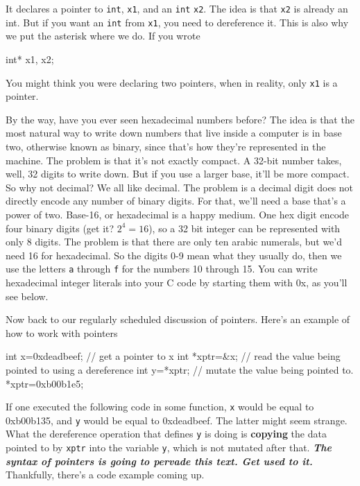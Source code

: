 \documentclass[ebook,11pt,oneside,openany]{memoir}
\newcommand{\cf}[1]{\texttt{#1}}
\begin{document}
It declares a pointer to \cf{int}, \cf{x1}, and an \cf{int} \cf{x2}. The idea is that \cf{x2} is already an int. But if you want an \cf{int} from \cf{x1}, you need to dereference it. This is also why we put the asterisk where we do. If you wrote 

\begin{code}[language=C]
int* x1, x2;
\end{code}

You might think you were declaring two pointers, when in reality, only \cf{x1} is a pointer.

By the way, have you ever seen hexadecimal numbers before? The idea is that the most natural way to write down numbers that live inside a computer is in base two, otherwise known as binary, since that's how they're represented in the machine. The problem is that it's not exactly compact. A 32-bit number takes, well, 32 digits to write down. But if you use a larger base, it'll be more compact. So why not decimal? We all like decimal. The problem is a decimal digit does not directly encode any number of binary digits. For that, we'll need a base that's a power of two. Base-16, or hexadecimal is a happy medium. One hex digit encode four binary digits (get it? $2^4=16$), so a 32 bit integer can be represented with only 8 digits. The problem is that there are only ten arabic numerals, but we'd need 16 for hexadecimal. So the digits 0-9 mean what they usually do, then we use the letters \cf{a} through \cf{f} for the numbers 10 through 15. You can write hexadecimal integer literals into your C code by starting them with 0x, as you'll see below.

Now back to our regularly scheduled discussion of pointers. Here's an example of how to work with pointers \pagebreak

\begin{code}[language=C]
int x=0xdeadbeef;
// get a pointer to x
int *xptr=&x;
// read the value being pointed to using a dereference
int y=*xptr;
// mutate the value being pointed to.
*xptr=0xb00b1e5;
\end{code}

\noindent
If one executed the following code in some function, \cf{x} would be equal to 0xb00b135, and \cf{y} would be equal to 0xdeadbeef. The latter might seem strange. What the dereference operation that defines \cf{y} is doing is \textbf{copying} the data pointed to by \cf{xptr} into the variable \cf{y}, which is not mutated after that. \textbf{\textit{The syntax of pointers is going to pervade this text. Get used to it.}} Thankfully, there's a code example coming up.
\end{document}
